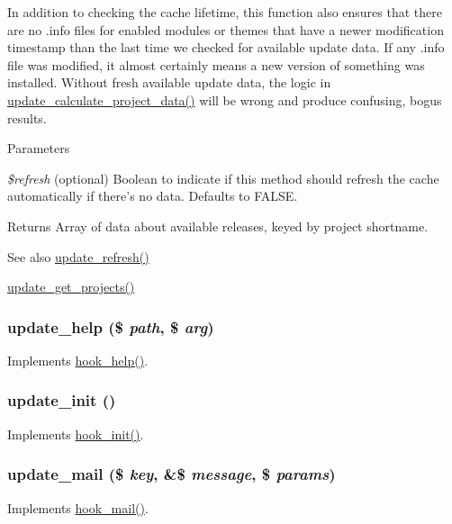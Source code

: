 In addition to checking the cache lifetime, this function also ensures that there are no .info files for enabled modules or themes that have a newer modification timestamp than the last time we checked for available update data. If any .info file was modified, it almost certainly means a new version of something was installed. Without fresh available update data, the logic in \hyperlink{update_8compare_8inc_aa0663304dc4634e4109c896f214ea791}{update\_\-calculate\_\-project\_\-data()} will be wrong and produce confusing, bogus results.


\begin{DoxyParams}{Parameters}
\item[{\em \$refresh}](optional) Boolean to indicate if this method should refresh the cache automatically if there's no data. Defaults to FALSE.\end{DoxyParams}
\begin{DoxyReturn}{Returns}
Array of data about available releases, keyed by project shortname.
\end{DoxyReturn}
\begin{DoxySeeAlso}{See also}
\hyperlink{update_8module_a601f9ec9c404ec41711b00884e7d0573}{update\_\-refresh()} 

\hyperlink{update_8compare_8inc_a7e1ea49d91f2d2b81b8101d481d10300}{update\_\-get\_\-projects()} 
\end{DoxySeeAlso}
\hypertarget{update_8module_ae87a65e26562585148f48262a4c12914}{
\subsubsection[{update\_\-help}]{\setlength{\rightskip}{0pt plus 5cm}update\_\-help (\$ {\em path}, \/  \$ {\em arg})}}
\label{update_8module_ae87a65e26562585148f48262a4c12914}
Implements \hyperlink{group__hooks_ga5589c2714a782738e8851c4c90231f0e}{hook\_\-help()}. \hypertarget{update_8module_a54a6a1b199a781dd0eb8620a0cd87e85}{
\subsubsection[{update\_\-init}]{\setlength{\rightskip}{0pt plus 5cm}update\_\-init ()}}
\label{update_8module_a54a6a1b199a781dd0eb8620a0cd87e85}
Implements \hyperlink{group__hooks_ga74edef0c463436fdbb1f92ef367db051}{hook\_\-init()}. \hypertarget{update_8module_aa1257da2e008c8b616daf5cf435a274b}{
\subsubsection[{update\_\-mail}]{\setlength{\rightskip}{0pt plus 5cm}update\_\-mail (\$ {\em key}, \/  \&\$ {\em message}, \/  \$ {\em params})}}
\label{update_8module_aa1257da2e008c8b616daf5cf435a274b}
Implements \hyperlink{group__hooks_gacdeb1cba0d0a86ac4de3fff7d4765777}{hook\_\-mail()}.

